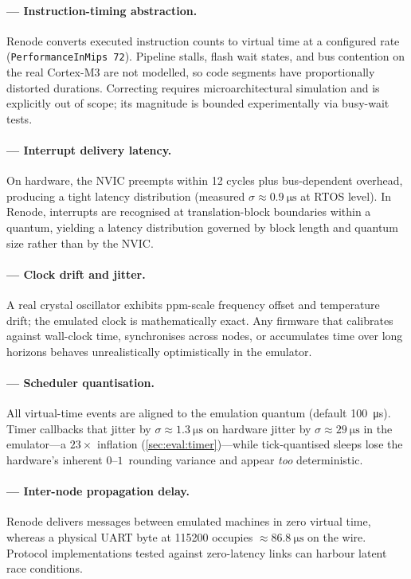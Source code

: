 \paragraph{ --- Instruction-timing abstraction.}
Renode converts executed instruction counts to virtual time at a
configured rate (\texttt{PerformanceInMips 72}). Pipeline stalls, flash
wait states, and bus contention on the real Cortex-M3 are not modelled,
so code segments have proportionally distorted durations. Correcting
 requires microarchitectural simulation and is explicitly out
of scope; its magnitude is bounded experimentally via busy-wait tests.

\paragraph{ --- Interrupt delivery latency.}
On hardware, the NVIC preempts within 12 cycles plus bus-dependent
overhead, producing a tight latency distribution (measured
$\sigma \approx \SI{0.9}{\micro\second}$ at RTOS level). In Renode,
interrupts are recognised at translation-block boundaries within a
quantum, yielding a latency distribution governed by block length and
quantum size rather than by the NVIC.

\paragraph{ --- Clock drift and jitter.}
A real crystal oscillator exhibits ppm-scale frequency offset and
temperature drift; the emulated clock is mathematically exact. Any
firmware that calibrates against wall-clock time, synchronises across
nodes, or accumulates time over long horizons behaves unrealistically
optimistically in the emulator.

\paragraph{ --- Scheduler quantisation.}
All virtual-time events are aligned to the emulation quantum (default
\SI{100}{\micro\second}). Timer callbacks that jitter by
$\sigma \approx \SI{1.3}{\micro\second}$ on hardware jitter by
$\sigma \approx \SI{29}{\micro\second}$ in the emulator---a
$23\times$ inflation (\cref{sec:eval:timer})---while tick-quantised
sleeps lose the hardware's inherent $0$--$1$\,\ms{} rounding variance
and appear \emph{too} deterministic.

\paragraph{ --- Inter-node propagation delay.}
Renode delivers messages between emulated machines in zero virtual
time, whereas a physical UART byte at \SI{115200}{\baud} occupies
$\approx \SI{86.8}{\micro\second}$ on the wire. Protocol
implementations tested against zero-latency links can harbour latent
race conditions.

